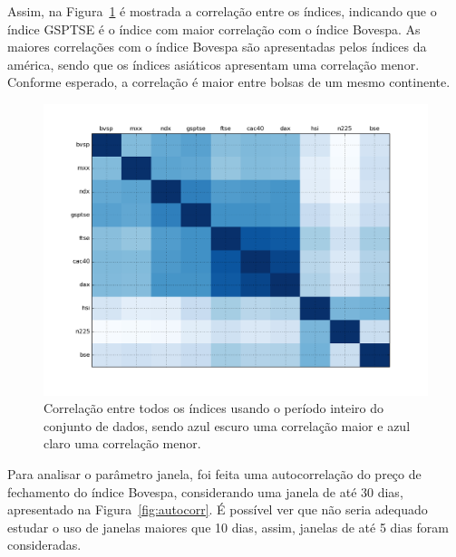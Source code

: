\documentclass[12pt,a4paper,utf8]{ppgsi}
\begin{document}


            Assim, na Figura~\ref{fig:corr} é mostrada a correlação entre os índices, indicando que o índice GSPTSE é o índice com maior correlação com o índice Bovespa. As maiores correlações com o índice Bovespa são apresentadas pelos índices da américa, sendo que os índices asiáticos apresentam uma correlação menor. Conforme esperado, a correlação é maior entre bolsas de um mesmo continente.

            \begin{figure}[htb]
            \centering
            \includegraphics[width=12cm]{correlacao.png}
            \caption{Correlação entre todos os índices usando o período inteiro do conjunto de dados, sendo azul escuro uma correlação maior e azul claro uma correlação menor.}
            \label{fig:corr}
            \end{figure}

        Para analisar o parâmetro janela, foi feita uma autocorrelação do preço de fechamento do índice Bovespa, considerando uma janela de até 30 dias, apresentado na Figura~\ref{fig:autocorr}. É possível ver que não seria adequado estudar o uso de janelas maiores que 10 dias, assim, janelas de até 5 dias foram consideradas.
\end{document}
